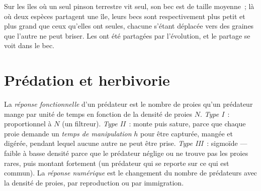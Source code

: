 \begin{example}\label{ex:b1:species-interactions:finches}
Sur les îles où un seul pinson terrestre vit seul, son bec est de
taille moyenne~; là où deux espèces partagent une île, leurs becs sont
respectivement plus petit et plus grand que ceux qu'elles ont seules,
chacune s'étant déplacée vers des graines que l'autre ne peut briser.
Les  ont été partagées par l'évolution, et le partage se voit
dans le bec.
\end{example}

\section{Prédation et herbivorie}

\begin{definition}\label{def:b1:species-interactions:functional}
La \emph{réponse fonctionnelle} d'un prédateur est le nombre de proies
qu'un prédateur mange par unité de temps en fonction de la densité de
proies $N$. \emph{Type I}~: proportionnel à $N$ (un filtreur).
\emph{Type II}~: monte puis sature, parce que chaque proie demande un
\emph{temps de manipulation} $h$ pour être capturée, mangée et digérée,
pendant lequel aucune autre ne peut être prise. \emph{Type III}~:
sigmoïde --- faible à basse densité parce que le prédateur néglige ou ne
trouve pas les proies rares, puis montant fortement (un prédateur qui
se reporte sur ce qui est commun). La \emph{réponse numérique} est le
changement du nombre de prédateurs avec la densité de proies, par
reproduction ou par immigration.
\end{definition}

